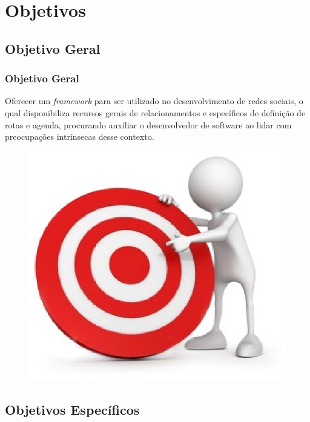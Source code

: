 \documentclass{beamer}
\begin{document}
\section{Objetivos}
\subsection{Objetivo Geral}

\begin{frame}
\frametitle{Objetivo Geral}

Oferecer um \textit{framework} para ser utilizado no desenvolvimento de redes sociais, o qual disponibiliza recursos gerais de relacionamentos e específicos de definição de rotas e agenda, procurando auxiliar o desenvolvedor de software ao lidar com preocupações intrínsecas desse contexto.

\begin{figure}[h]
	\centering
	\includegraphics[scale=0.4]{figuras/objective.eps}
\end{figure}

\end{frame}

\subsection{Objetivos Específicos}
\end{document}
